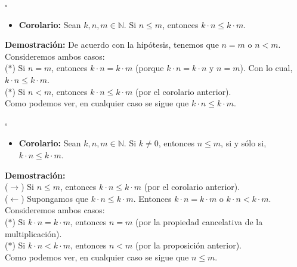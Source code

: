 \documentclass[10 pt]{article}
\begin{document}
\begin{flushright}
    $\square$
\end{flushright}

\begin{itemize}
    \item \Large{\textbf{Corolario:} Sean $k,n,m \in \mathbb N$. Si $n \leq m$, entonces $k \cdot n \leq k \cdot m$.} \\
\end{itemize}

\Large{\textbf{Demostración:} De acuerdo con la hipótesis, tenemos que $n=m$ o $n<m$. Consideremos ambos casos: \\

($\ast$) Si $n=m$, entonces $k \cdot n=k \cdot m$ (porque $k \cdot n=k \cdot n$ y $n=m$). Con lo cual, $k \cdot n \leq k \cdot m$. \\

($\ast$) Si $n<m$, entonces $k \cdot n \leq k \cdot m$ (por el corolario anterior). \\

Como podemos ver, en cualquier caso se sigue que $k \cdot n \leq k \cdot m$.} \\

\begin{flushright}
    $\square$
\end{flushright}

\begin{itemize}
    \item \Large{\textbf{Corolario:} Sean $k,n,m \in \mathbb N$. Si $k \neq 0$, entonces $n \leq m$, si y sólo si, $k \cdot n \leq k \cdot m$.} \\
\end{itemize}

\Large{\textbf{Demostración:} \\

($\rightarrow$) Si $n \leq m$, entonces $k \cdot n \leq k \cdot m$ (por el corolario anterior). \\

($\leftarrow$) Supongamos que $k \cdot n \leq k \cdot m$. Entonces $k \cdot n=k \cdot m$ o $k \cdot n<k \cdot m$. Consideremos ambos casos: \\

($\ast$) Si $k \cdot n=k \cdot m$, entonces $n=m$ (por la propiedad cancelativa de la multiplicación). \\

($\ast$) Si $k \cdot n<k \cdot m$, entonces $n<m$ (por la proposición anterior). \\

Como podemos ver, en cualquier caso se sigue que $n \leq m$.} \\
\end{document}
